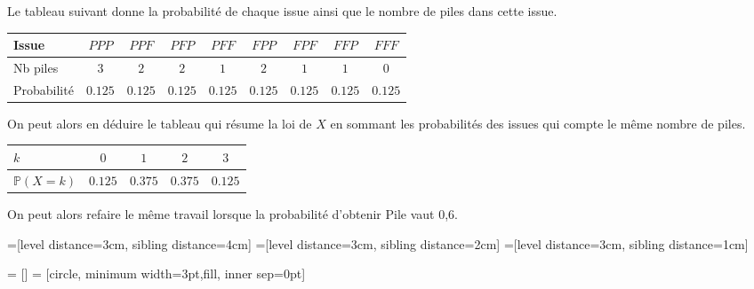 \documentclass[11pt,fleqn, openany]{book} %
\begin{document}
\begin{solution}
Le tableau suivant donne la probabilité de chaque issue ainsi que le nombre de piles dans cette issue.

\begin{center}
\begin{tabular}{|l|c|c|c|c|c|c|c|c|}
\hline
Issue & $PPP$ & $PPF$ & $PFP$ & $PFF$ & $FPP$ & $FPF$ & $FFP$ & $FFF$ \\
\hline
Nb piles & $3$ & $2$ & $2$ & $1$ & $2$ & $1$ & $1$&$0$\\
\hline
Probabilité & $0.125$ & $0.125$ & $0.125$ & $0.125$ & $0.125$ & $0.125$  & $0.125$ & $0.125$ \\
\hline \end{tabular}
\end{center}

On peut alors en déduire le tableau qui résume la loi de $X$ en sommant les probabilités des issues qui compte le même nombre de piles.

\begin{center}
\begin{tabular}{|l|c|c|c|c|}
\hline
$k$ & $0$ & $1$ & $2$  & $3$ \\
\hline
$\mathbb{P}(X=k)$ & $0.125$ & $0.375$ & $0.375$ & $0.125$ \\
\hline \end{tabular}
\end{center}

On peut alors refaire le même travail lorsque la probabilité d'obtenir Pile vaut 0,6.

=[level distance=3cm, sibling distance=4cm]
=[level distance=3cm, sibling distance=2cm]
=[level distance=3cm, sibling distance=1cm]

 = []
 = [circle, minimum width=3pt,fill, inner sep=0pt]


\end{solution}
\end{document}
